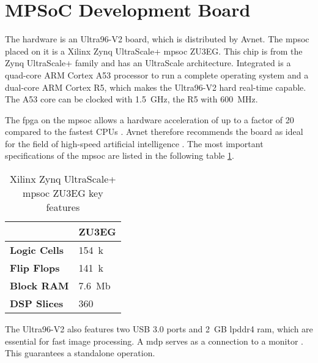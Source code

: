 \section{MPSoC Development Board}
\label{sec:hardware:mpsoc_development_board}

The hardware is an Ultra96-V2 board, which is distributed by Avnet.
The \acrfull{mpsoc} placed on it is a Xilinx Zynq UltraScale+ \acrshort{mpsoc} ZU3EG.
This chip is from the Zynq UltraScale+ family and has an UltraScale architecture.
Integrated is a quad-core ARM Cortex A53 processor to run a complete operating system and a dual-core ARM Cortex R5, which makes the Ultra96-V2 hard real-time capable.
The A53 core can be clocked with \SI{1.5}{GHz}, the R5 with \SI{600}{MHz}.

The \acrshort{fpga} on the \acrshort{mpsoc} allows a hardware acceleration of up to a factor of 20 compared to the fastest CPUs \cite{acceleration_xilinx}.
Avnet therefore recommends the board as ideal for the field of high-speed artificial intelligence \cite{ai_resources_xilinx}.
The most important specifications of the \acrshort{mpsoc} are listed in the following table \ref{tab:specs_MPSoC}.

\begin{table}[h]
	\caption{Xilinx Zynq UltraScale+ \acrshort{mpsoc} ZU3EG key features \cite{xilinx_zynq}}
	\label{tab:specs_MPSoC}
	\centering
	\begin{tabular}{ll}
		\toprule
		& \textbf{ZU3EG} \\
		\midrule
		\textbf{Logic Cells} & \SI{154}{k} \\
		\textbf{Flip Flops} & \SI{141}{k} \\
		\textbf{Block RAM} & \SI{7.6}{Mb} \\
		\textbf{DSP Slices} & 360 \\
		\bottomrule
	\end{tabular}
\end{table}

The Ultra96-V2 also features two USB 3.0 ports and \SI{2}{GB} \acrfull{lpddr4} \acrshort{ram}, which are essential for fast image processing.
A \acrfull{mdp} serves as a connection to a monitor \cite{avnet_ultra96v2}.
This guarantees a standalone operation.

